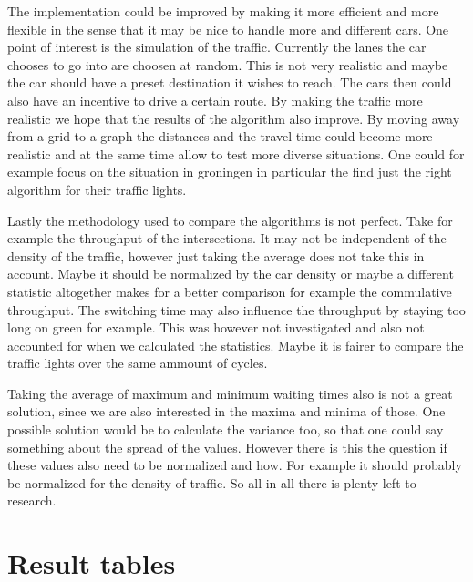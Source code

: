 \documentclass[a4paper,11pt]{article}
\begin{document}
The implementation could be improved by making it more efficient and more flexible in the sense that it may be nice to handle more and different cars.
One point of interest is the simulation of the traffic.
Currently the lanes the car chooses to go into are choosen at random.
This is not very realistic and maybe the car should have a preset destination it wishes to reach.
The cars then could also have an incentive to drive a certain route.
By making the traffic more realistic we hope that the results of the algorithm also improve.
By moving away from a grid to a graph the distances and the travel time could become more realistic and at the same time allow to test more diverse situations.
One could for example focus on the situation in groningen in particular the find just the right algorithm for their traffic lights.

Lastly the methodology used to compare the algorithms is not perfect.
Take for example the throughput of the intersections.
It may not be independent of the density of the traffic, however just taking the average does not take this in account.
Maybe it should be normalized by the car density or maybe a different statistic altogether makes for a better comparison for example the commulative throughput.
The switching time may also influence the throughput by staying too long on green for example.
This was however not investigated and also not accounted for when we calculated the statistics.
Maybe it is fairer to compare the traffic lights over the same ammount of cycles.

Taking the average of maximum and minimum waiting times also is not a great solution, since we are also interested in the maxima and minima of those.
One possible solution would be to calculate the variance too, so that one could say something about the spread of the values.
However there is this the question if these values also need to be normalized and how.
For example it should probably be normalized for the density of traffic.
So all in all there is plenty left to research.





\appendix
\section{Result tables}\label{app:rtables}
\end{document}
